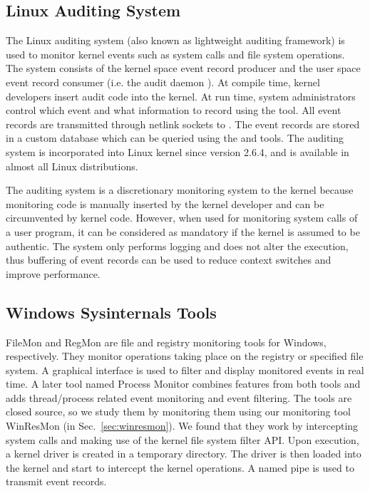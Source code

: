 \subsection{Linux Auditing System}
\label{sec:laudit}

The Linux auditing system (also known as lightweight auditing framework)
is used to monitor kernel events such as system calls and file system
operations.
The system consists of the kernel space event record producer and
the user space event record consumer (i.e. the audit daemon ).
At compile time,
kernel developers insert audit code into the kernel.
At run time, system administrators control which event and what information
to record using the  tool.
All event records are transmitted through netlink sockets to .
The event records are stored in a custom database which can be queried
using the  and  tools.
The auditing system is incorporated into Linux kernel since version 2.6.4,
and is available in almost all Linux distributions.

The auditing system is a discretionary monitoring system to the kernel because
monitoring code is manually inserted by the kernel developer and can
be circumvented by kernel code.
However, when used for monitoring system calls of a user program,
it can be considered as mandatory if the kernel is assumed to be authentic.
The system only performs logging and does not alter the execution,
thus buffering of event records can be used to reduce context switches
and improve performance.

\subsection{Windows Sysinternals Tools}
\label{sec:sysinternals}

FileMon \cite{filemon} and RegMon \cite{regmon}
are file and registry monitoring tools for Windows, respectively.
They monitor operations taking place on
the registry or specified file system.
A graphical interface is used to filter and display monitored events in real time.
A later tool named Process Monitor combines features from both tools
and adds thread/process related event monitoring and event filtering.
The tools are closed source, so we study them by monitoring them
using our monitoring tool WinResMon (in Sec.~\ref{sec:winresmon}).
We found that they work by intercepting system calls and making
use of the kernel file system filter API.
Upon execution, a kernel driver is created in a temporary directory.
The driver is then loaded into the kernel and start to intercept
the kernel operations.
A named pipe is used to transmit event records.

